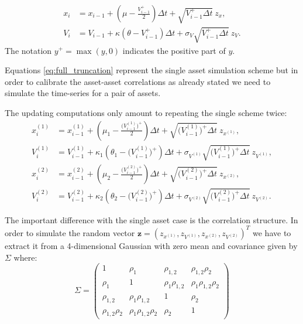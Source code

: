 \begin{subequations}
	\label{eq:full_truncation}
	\begin{align}
	x_i &= x_{i-1} + (\mu -  \frac{V_{i-1}^+}{2})\Delta t + \sqrt{V_{i-1}^+ \Delta t} \:z_x, \\
	V_i &= V_{i-1} + \kappa(\theta - V_{i-1}^+ )\Delta t + \sigma_V \sqrt{V_{i-1}^+ \Delta t} \: z_V.
	\end{align}
\end{subequations}
The notation $y^+ = \max(y, 0)$ indicates the positive part of $y$. 

Equations \eqref{eq:full_truncation} represent the single asset simulation scheme but in order to calibrate the asset-asset correlations as already stated we need to simulate the time-series for a pair of assets.

The updating computations only amount to repeating the single scheme twice:
\begin{subequations}
	\label{eq:full_truncation2}
	\begin{align}
	x_i^{(1)} &= x_{i-1}^{(1)} + (\mu_1 -  \frac{\Big(V_{i-1}^{(1)}\Big)^+}{2})\Delta t + \sqrt{\Big(V_{i-1}^{(1)}\Big)^+ \Delta t} \:z_{x^{(1)}}, \\
	V_i^{(1)} &= V_{i-1}^{(1)} + \kappa_1(\theta_1 - \Big(V_{i-1}^{(1)}\Big)^+ )\Delta t + \sigma_{V^{(1)}} \sqrt{\Big(V_{i-1}^{(1)}\Big)^+ \Delta t} \: z_{V^(1)},\\
	x_i^{(2)} &= x_{i-1}^{(2)} + (\mu_2 -  \frac{\Big(V_{i-1}^{(2)}\Big)^+}{2})\Delta t + \sqrt{\Big(V_{i-1}^{(2)}\Big)^+\Delta t} \:z_{x^{(2)}}, \\
	V_i^{(2)} &= V_{i-1}^{(2)} + \kappa_2(\theta_2 - \Big(V_{i-1}^{(2)}\Big)^+ )\Delta t + \sigma_{V^{(2)}} \sqrt{\Big(V_{i-1}^{(2)}\Big)^+ \Delta t} \: z_{V^{(2)}}.
	\end{align}
\end{subequations}

The important difference with the single asset case is the correlation structure. In order to simulate the random vector $\mathbf{z} = (z_{x^{(1)}}, z_{V^{(1)}}, z_{x^{(2)}}, z_{V^{(2)}})^T$ we have to extract it from a 4-dimensional Gaussian with zero mean and covariance given by $\Sigma$ where:
\begin{equation}
\label{eq:corr_matrix}
	\Sigma = \begin{pmatrix}
	1 	& \rho_1 & \rho_{1,2} & \rho_{1,2} \rho_2\\
	\rho_1 & 1 & \rho_1 \rho_{1,2} & \rho_1 \rho_{1,2} \rho_2\\
	 \rho_{1,2} & \rho_1 \rho_{1,2}  & 1 & \rho_2 \\
	 \rho_{1,2} \rho_2 & \rho_1 \rho_{1,2} \rho_2&\rho_2  & 1
	\end{pmatrix}
\end{equation}

